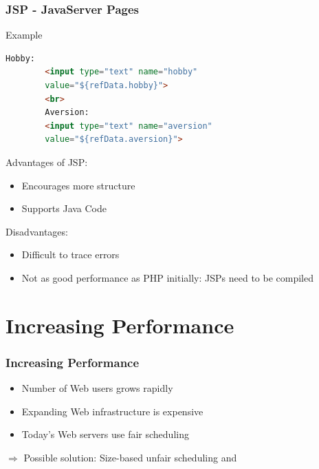 \documentclass[9pt]{beamer}
\begin{document}
\begin{frame}[fragile]
\frametitle<presentation>{JSP - JavaServer Pages}
  \begin{exampleblock}{Example}
    \begin{lstlisting}[language=html, captionpos=b,caption={Java embedded in HTML. Taken from \cite{downey2008web}},label=lst:jsp]
        Hobby:
        <input type="text" name="hobby" 
        value="${refData.hobby}">
        <br>
        Aversion:
        <input type="text" name="aversion" 
        value="${refData.aversion}">
    \end{lstlisting}
  \end{exampleblock}

\end{frame}

\begin{frame}
  \begin{multicols}{2}
    Advantages of JSP:
    \begin{itemize}
    \item Encourages more structure
    \item Supports Java Code 
    \end{itemize}
    \vfill
    \columnbreak
    
    Disadvantages:
    \begin{itemize}
      \item Difficult to trace errors
      \item Not as good performance as PHP initially: JSPs need to be compiled
    \end{itemize}
  \end{multicols}
\end{frame}

\section{Increasing Performance}

\begin{frame}
\frametitle<presentation>{Increasing Performance}

  \begin{itemize}
    \item Number of Web users grows rapidly
    \item Expanding Web infrastructure is expensive
    \item Today's Web servers use fair scheduling 
  \end{itemize}
  $\Longrightarrow$ Possible solution: Size-based unfair scheduling \cite{schroederSize} and \cite{schorederSchedule}

\end{frame}
\end{document}

